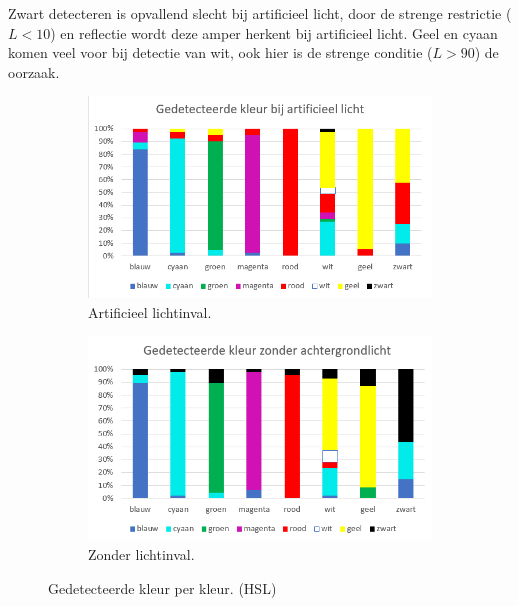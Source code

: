 Zwart detecteren is opvallend slecht bij artificieel licht, door de strenge restrictie ($L < 10$) en reflectie wordt deze amper herkent bij artificieel licht. Geel en cyaan komen veel voor bij detectie van wit, ook hier is de strenge conditie ($L > 90$) de oorzaak.

\begin{figure}
	\begin{subfigure}{0.5\textwidth}
	\centering
	\includegraphics[scale=0.6]{img/artificialLightning}
	\caption{Artificieel lichtinval.}
	\end{subfigure}
	\begin{subfigure}{0.5\textwidth}
	\centering
	\includegraphics[scale=0.6]{img/noneLightning}
	\caption{Zonder lichtinval.}
	\end{subfigure}
	\caption{Gedetecteerde kleur per kleur. (HSL)}
	\label{fig:lichtinval}
\end{figure}

